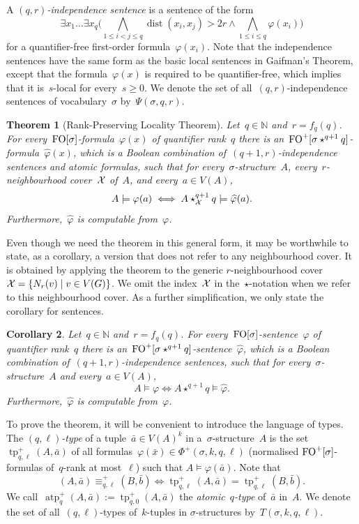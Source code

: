 \documentclass[11pt]{article}
\newtheorem{theorem}{Theorem}[section]
\newtheorem{corollary}[theorem]{Corollary}
\numberwithin{equation}{section}
\newcommand{\FO}{\textup{FO}}
\newcommand{\tp}{\operatorname{tp}^+}
\newcommand{\atp}{\operatorname{atp}^+}
\newcommand{\dist}{\operatorname{dist}}
\renewcommand{\phi}{\varphi}
\newcommand{\tup}[1]{\bar{#1}}
\newcommand{\hphi}{\widehat{\phi}}
\begin{document}
A \emph{$(q,r)$-independence sentence} is a sentence of the form
\[
\exists x_1\ldots\exists x_q\Big(\bigwedge_{1\le i<j\le
  q}\dist(x_i,x_j)> 2r\wedge\bigwedge_{1\le i\le q}
\phi(x_i)\Big)
\]
for a quantifier-free first-order formula~$\phi(x_i)$. Note that the independence
sentences have the same form as the basic local sentences in Gaifman's
Theorem, except that the formula~$\phi(x)$ is required to be
quantifier-free, which implies that it is~$s$-local for every~$s\geq
0$. We denote the set of all~$(q,r)$-independence sentences of
vocabulary~$\sigma$ by~$\Psi(\sigma,q,r)$.%



\begin{theorem}[Rank-Preserving Locality Theorem]\label{thm:rplocality}
  Let~$q\in\mathbb N$ and~$r=f_q(q)$. For
  every~$\FO[\sigma]$-formula~$\phi(x)$ of quantifier rank~$q$ there
  is an~$\FO^+[\sigma\star^{q+1} q]$-formula~$\hphi(x)$, which is a
  Boolean combination of~$(q+1,r)$-independence sentences and atomic
  formulas, such that for every~$\sigma$-structure~$A$,
  every~$r$-neighbourhood cover~$\mathcal{X}$ of~$A$, and every~$a\in V(A)$,
  \[
  A\models\phi(a)\iff A\star_{\XXX}^{q+1}q\models\hphi(a). 
  \]
  Furthermore,~$\hphi$ is computable from~$\phi$.
\end{theorem}

Even though we need the theorem in this general form, it may be
worthwhile to state, as a corollary, a version that does not refer to any
neighbourhood cover. It is obtained by applying the theorem to the generic
$r$-neighbourhood cover~$\mathcal{X}=\{N_r(v)\mid v\in V(G)\}$. We omit the
index~$\mathcal{X}$ in the~$\star$-notation when we refer to this
neighbourhood cover. As a further simplification, we only state the
corollary for sentences.

\begin{corollary}
  Let~$q\in\mathbb N$ and~$r=f_q(q)$. For
  every~$\FO[\sigma]$-sentence~$\phi$ of quantifier rank~$q$ there is
  an~$\FO^+[\sigma\star^{q+1} q]$-sentence~$\hphi$, which is a Boolean
  combination of~$(q+1,r)$-independence sentences, such that for
  every~$\sigma$-structure~$A$ and every~$a\in V(A)$,
  \[
  A\models\phi\iff A\star^{q+1}q\models\hphi. 
  \]
  Furthermore,~$\hphi$ is computable from~$\phi$.
\end{corollary}
 

To prove the theorem, it will be convenient to 
introduce the language
of types.  The \emph{$(q,{\ell})$-type} of a tuple~$\tup a\in V(A)^{k}$ in
a~$\sigma$-structure~$A$ is the set~$\tp_{q,{\ell}}(A,\tup
a)$
of all
formulas~$\phi(\tup x)\in\Phi^+(\sigma,k,q,{\ell})$ (normalised
$\FO^+[\sigma]$-formulas of~$q$-rank at most~${\ell}$) such that
$A\models\phi(\tup a)$. Note that
\[
(A,\tup a)\equiv^+_{q,{\ell}} (B,\tup b)\iff\tp_{q,{\ell}}(A,\tup
a)=\tp_{q,{\ell}}(B,\tup b).
\]
We call~$\atp_q(A,\tup a):=\tp_{q,0}(A,\tup
a)$
the \emph{atomic~$q$-type} of~$\tup a$ in~$A$.  We denote the set of
all~$(q,{\ell})$-types of~$k$-tuples in $\sigma$-structures
by~$T(\sigma,k,q,{\ell})$.
\end{document}
